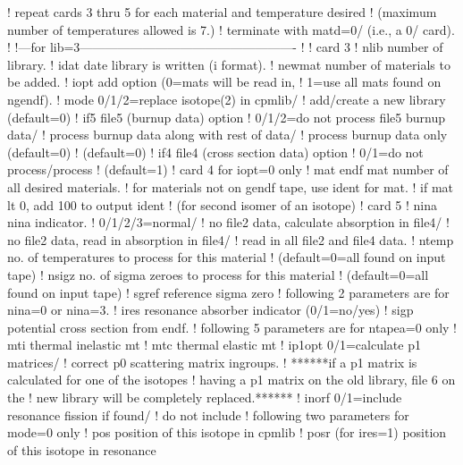 \begin{ccode}
   ! repeat cards 3 thru 5 for each material and temperature desired
   ! (maximum number of temperatures allowed is 7.)
   ! terminate with matd=0/ (i.e., a 0/ card).
   !
   !---for lib=3----------------------------------------------------
   !
   ! card 3
   !    nlib    number of library.
   !    idat    date library is written (i format).
   !    newmat  number of materials to be added.
   !    iopt    add option (0=mats will be read in,
   !                        1=use all mats found on ngendf).
   !    mode    0/1/2=replace isotope(2) in cpmlib/
   !                   add/create a new library (default=0)
   !    if5     file5 (burnup data) option
   !            0/1/2=do not process file5 burnup data/
   !                   process burnup data along with rest of data/
   !                   process burnup data only (default=0)
   !            (default=0)
   !    if4     file4 (cross section data) option
   !            0/1=do not process/process
   !            (default=1)
   ! card 4 for iopt=0 only
   !    mat     endf mat number of all desired materials.
   !            for materials not on gendf tape, use ident for mat.
   !            if mat lt 0, add 100 to output ident
   !            (for second isomer of an isotope)
   ! card 5
   !    nina    nina indicator.
   !            0/1/2/3=normal/
   !                  no file2 data, calculate absorption in file4/
   !                  no file2 data, read in absorption in file4/
   !                  read in all file2 and file4 data.
   !    ntemp   no. of temperatures to process for this material
   !            (default=0=all found on input tape)
   !    nsigz   no. of sigma zeroes to process for this material
   !            (default=0=all found on input tape)
   !    sgref   reference sigma zero
   !    following 2 parameters are for nina=0 or nina=3.
   !    ires    resonance absorber indicator (0/1=no/yes)
   !    sigp    potential cross section from endf.
   !    following 5 parameters are for ntapea=0 only
   !    mti     thermal inelastic mt
   !    mtc     thermal elastic mt
   !    ip1opt  0/1=calculate p1 matrices/
   !                correct p0 scattering matrix ingroups.
   !  ******if a p1 matrix is calculated for one of the isotopes
   !        having a p1 matrix on the old library, file 6 on the
   !        new library will be completely replaced.******
   !    inorf   0/1=include resonance fission if found/
   !                do not include
   !    following two parameters for mode=0 only
   !    pos     position of this isotope in cpmlib
   !    posr    (for ires=1) position of this isotope in resonance

\end{ccode}
